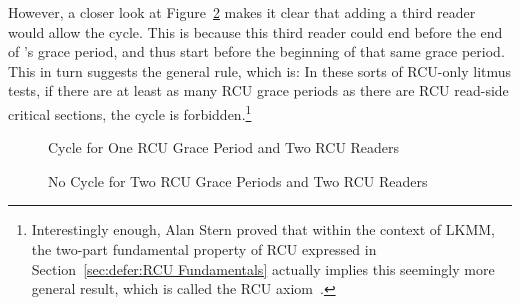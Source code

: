 However, a closer look at
Figure~\ref{fig:memorder:No Cycle for Two RCU Grace Periods and Two RCU Readers}
makes it clear that adding a third reader would allow the cycle.
This is because this third reader could end before the end of 's
grace period, and thus start before the beginning of that same grace
period.
This in turn suggests the general rule, which is:  In these sorts of RCU-only
litmus tests, if there are at least as many RCU grace periods as there
are RCU read-side critical sections, the cycle is forbidden.\footnote{
	Interestingly enough, Alan Stern proved that within the context
	of LKMM, the two-part fundamental property of RCU expressed
	in Section~\ref{sec:defer:RCU Fundamentals} actually implies
	this seemingly more general result, which is called the RCU
	axiom~\cite{Alglave:2018:FSC:3173162.3177156}.}
\fi

\begin{figure}[tbp]
\centering
{}
\caption{Cycle for One RCU Grace Period and Two RCU Readers}
\label{fig:memorder:Cycle for One RCU Grace Period and Two RCU Readers}
\end{figure}

\begin{figure}[tbp]
\centering
{}
\caption{No Cycle for Two RCU Grace Periods and Two RCU Readers}
\label{fig:memorder:No Cycle for Two RCU Grace Periods and Two RCU Readers}
\end{figure}

